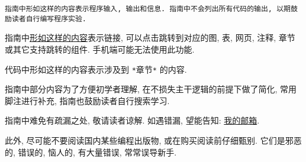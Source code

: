 
\begin{lstlisting}
指南中形如这样的内容表示程序输入, 输出和信息. 指南中不会列出所有代码的输出, 以期鼓励读者自行编写程序实验.
\end{lstlisting}

    \vspace*{5pt}
    指南中\href{https://www.baidu.com}{形如这样的内容}表示链接, 可以点击跳转到对应的图, 表, 网页, 注释, 章节或其它支持跳转的组件. 手机端可能无法使用此功能.

    \begin{mdframed}[linecolor=darkgray]
        代码中形如这样的内容表示涉及到 \texttt{*}章节\texttt{*} 的内容.
    \end{mdframed}

    指南中部分内容为了方便初学者理解, 在不损失主干逻辑的前提下做了简化, 常用脚注进行补充, 指南也鼓励读者自行搜索学习.

    指南中难免有疏漏之处, 敬请读者谅解. 如遇错漏, 望能告知: \href{mailto: wutong.tony@foxmail.com}{我的邮箱}.

    此外, 尽可能不要阅读国内某些编程出版物, 或在购买阅读前仔细甄别. 它们是邪恶的, 错误的, 恼人的, 有大量错误, 常常误导新手.